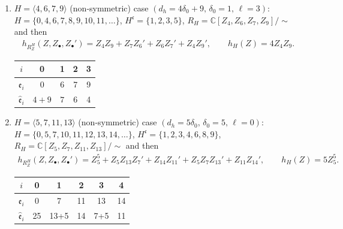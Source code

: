 \documentclass[10pt,a4paper]{amsart}
\def\CC{{\mathbb C}}
\def\fc{{\mathfrak c}}
\def\fe{{\mathfrak e}}
\def\hfe{{\widehat{\mathfrak e}}}
\numberwithin{equation}{section}
\begin{document}
\begin{Example}\quad
\begin{enumerate}\itemsep=0pt

\item $H=\langle 4, 6, 7, 9\rangle$ (non-symmetric) case $(d_h=4\delta_0+9,\, \delta_0=1,\, \ell=3)$:
$H = \{0, 4, 6, 7, 8, 9, 10, \allowbreak 11, \dots\}$, $H^\fc = \{1, 2, 3, 5\}$,
$R_H = \CC[Z_4, Z_6, Z_{7}, Z_{9}]/{\sim} $ and then
\begin{gather*}
h_{{R_Z^H}}(Z, Z_\bullet, Z_\bullet') =
Z_4Z_9 + Z_{7} Z_{6}'+Z_6 Z_{7}'+ Z_4 Z_9',
\qquad
h_H(Z) = 4 Z_4Z_9.
\end{gather*}
\begin{table}[htb]\centering\vspace{-5mm}
 \begin{tabular}{|c|cccc|}
\hline
$i$&0&1&2&3\\
\hline
$\fe_i $ &0 &6 & 7& 9 \\
$\hfe_i$ &$4+9$ &$7$ & $6$& 4 \\
\hline
 \end{tabular}
\end{table}\label{2tb:Ex50}

\item $H=\langle 5, 7, 11, 13\rangle$ (non-symmetric) case $(d_h=5 \delta_0,\, \delta_0=5, \, \ell=0)$:
$H = \{0, 5, 7, 10, 11, 12,\allowbreak 13, 14, \dots\}$, $H^\fc = \{1, 2, 3, 4, 6, 8, 9\}$,
$R_H = \CC[Z_5, Z_7, Z_{11}, Z_{13}]/ {\sim} $ and then
\begin{gather*}
h_{{R_Z^H}}(Z, Z_\bullet, Z_\bullet') =
Z_5^5 + Z_5 Z_{13} Z_7'+ Z_{14} Z_{11}'+Z_5 Z_7 Z_{13}'+Z_{11} Z_{14}',
\qquad
h_H(Z) = 5 Z_5^5.
\end{gather*}
\begin{table}[htb]\centering\vspace{-5mm}
 \begin{tabular}{|c|ccccc|}
\hline
$i$&0&1&2&3&4\\
\hline
$\fe_i $ &0 &7 & 11& 13 &14 \\
$\hfe_i$ &25 &13+5 & 14& 7+5 &11 \\
\hline
 \end{tabular}
\end{table}\label{2tb:Ex5}



\end{enumerate}
\end{Example}
\end{document}
